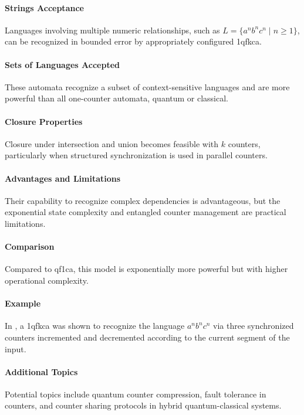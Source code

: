 \paragraph{Strings Acceptance}
Languages involving multiple numeric relationships, such as $L = \{ a^n b^n c^n \mid n \geq 1 \}$, can be recognized in bounded error by appropriately configured \gls{1qfkca}.

\paragraph{Sets of Languages Accepted}
These automata recognize a subset of context-sensitive languages and are more powerful than all one-counter automata, quantum or classical.

\paragraph{Closure Properties}
Closure under intersection and union becomes feasible with $k$ counters, particularly when structured synchronization is used in parallel counters.

\paragraph{Advantages and Limitations}
Their capability to recognize complex dependencies is advantageous, but the exponential state complexity and entangled counter management are practical limitations.

\paragraph{Comparison}
Compared to \gls{qf1ca}, this model is exponentially more powerful but with higher operational complexity.

\paragraph{Example}
In \cite{cem2012quantum}, a \gls{1qfkca} was shown to recognize the language $a^n b^n c^n$ via three synchronized counters incremented and decremented according to the current segment of the input.

\paragraph{Additional Topics}
Potential topics include quantum counter compression, fault tolerance in counters, and counter sharing protocols in hybrid quantum-classical systems.

